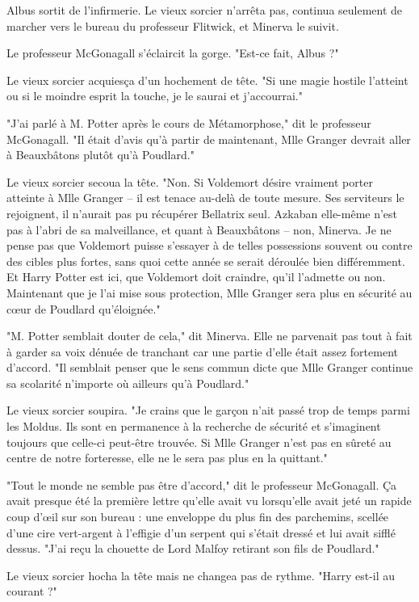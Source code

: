 Albus sortit de l'infirmerie. Le vieux sorcier n'arrêta pas, continua seulement de marcher vers le bureau du professeur Flitwick, et Minerva le suivit.

Le professeur McGonagall s'éclaircit la gorge. "Est-ce fait, Albus ?"

Le vieux sorcier acquiesça d'un hochement de tête. "Si une magie hostile l'atteint ou si le moindre esprit la touche, je le saurai et j'accourrai."

"J'ai parlé à M. Potter après le cours de Métamorphose," dit le professeur McGonagall. "Il était d'avis qu'à partir de maintenant, Mlle Granger devrait aller à Beauxbâtons plutôt qu'à Poudlard."

Le vieux sorcier secoua la tête. "Non. Si Voldemort désire vraiment porter atteinte à Mlle Granger – il est tenace au-delà de toute mesure. Ses serviteurs le rejoignent, il n'aurait pas pu récupérer Bellatrix seul. Azkaban elle-même n'est pas à l'abri de sa malveillance, et quant à Beauxbâtons – non, Minerva. Je ne pense pas que Voldemort puisse s'essayer à de telles possessions souvent ou contre des cibles plus fortes, sans quoi cette année se serait déroulée bien différemment. Et Harry Potter est ici, que Voldemort doit craindre, qu'il l'admette ou non. Maintenant que je l'ai mise sous protection, Mlle Granger sera plus en sécurité au cœur de Poudlard qu'éloignée."

"M. Potter semblait douter de cela," dit Minerva. Elle ne parvenait pas tout à fait à garder sa voix dénuée de tranchant car une partie d'elle était assez fortement d'accord. "Il semblait penser que le sens commun dicte que Mlle Granger continue sa scolarité n'importe où ailleurs qu'à Poudlard."

Le vieux sorcier soupira. "Je crains que le garçon n'ait passé trop de temps parmi les Moldus. Ils sont en permanence à la recherche de sécurité et s'imaginent toujours que celle-ci peut-être trouvée. Si Mlle Granger n'est pas en sûreté au centre de notre forteresse, elle ne le sera pas plus en la quittant."

"Tout le monde ne semble pas être d'accord," dit le professeur McGonagall. Ça avait presque été la première lettre qu'elle avait vu lorsqu'elle avait jeté un rapide coup d'œil sur son bureau : une enveloppe du plus fin des parchemins, scellée d'une cire vert-argent à l'effigie d'un serpent qui s'était dressé et lui avait sifflé dessus. "J'ai reçu la chouette de Lord Malfoy retirant son fils de Poudlard."

Le vieux sorcier hocha la tête mais ne changea pas de rythme. "Harry est-il au courant ?"

